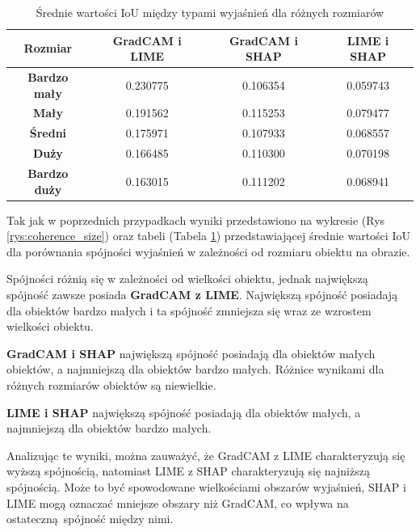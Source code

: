 \begin{table}[h]
	\centering
	\begin{tabular}{|c|c|c|c|}
		\hline
		\textbf{Rozmiar}     & \textbf{GradCAM i LIME} & \textbf{GradCAM i SHAP} & \textbf{LIME i SHAP} \\
		\hline
		\textbf{Bardzo mały} & 0.230775                & 0.106354                & 0.059743             \\
		\hline
		\textbf{Mały}        & 0.191562                & 0.115253                & 0.079477             \\
		\hline
		\textbf{Średni}      & 0.175971                & 0.107933                & 0.068557             \\
		\hline
		\textbf{Duży}        & 0.166485                & 0.110300                & 0.070198             \\
		\hline
		\textbf{Bardzo duży} & 0.163015                & 0.111202                & 0.068941             \\
		\hline
	\end{tabular}
	\caption{Średnie wartości IoU między typami wyjaśnień dla różnych rozmiarów}
	\label{tab:base_coherence_size}
\end{table}

Tak jak w poprzednich przypadkach wyniki przedstawiono na wykresie (Rys \ref{rys:coherence_size}) oraz tabeli (Tabela \ref{tab:base_coherence_size}) przedstawiającej średnie wartości IoU dla porównania spójności wyjaśnień w zależności od rozmiaru obiektu na obrazie.

Spójności różnią się w zależności od wielkości obiektu, jednak największą spójność zawsze posiada \textbf{GradCAM z LIME}.
Największą spójność posiadają dla obiektów bardzo małych i ta spójność zmniejsza się wraz ze wzrostem wielkości obiektu.

\textbf{GradCAM i SHAP} największą spójność posiadają dla obiektów małych obiektów, a najmniejszą dla obiektów bardzo małych.
Różnice wynikami dla różnych rozmiarów obiektów są niewielkie.

\textbf{LIME i SHAP} największą spójność posiadają dla obiektów małych, a najmniejszą dla obiektów bardzo małych.

\vspace{1cm}
Analizując te wyniki, można zauważyć, że GradCAM z LIME charakteryzują się wyższą spójnością, natomiast LIME z SHAP charakteryzują się najniższą spójnością.
Może to być spowodowane wielkościami obszarów wyjaśnień, SHAP i LIME mogą oznaczać mniejsze obszary niż GradCAM, co wpływa na ostateczną spójność między nimi.
